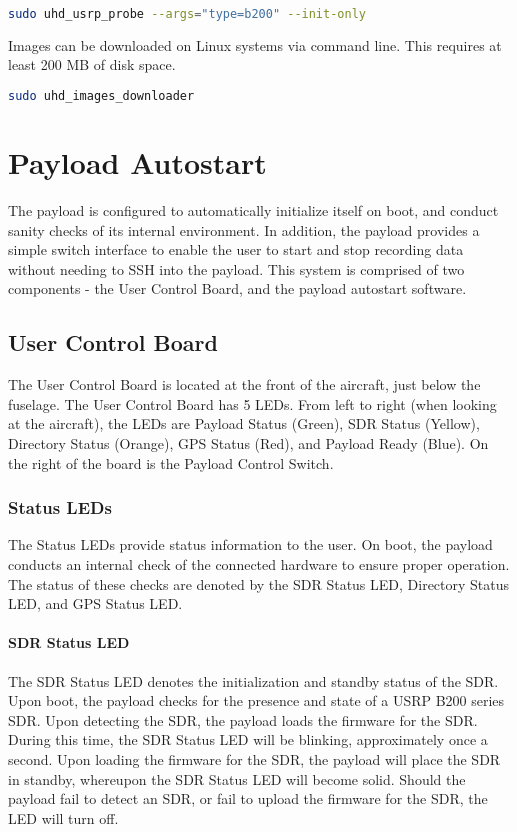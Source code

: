 \documentclass{report}
\begin{document}
				\begin{lstlisting}[language=sh]
sudo uhd_usrp_probe --args="type=b200" --init-only
				\end{lstlisting}

				Images can be downloaded on Linux systems via command line.  This requires at least 200 MB of disk space.

				\begin{lstlisting}[language=sh]
sudo uhd_images_downloader
				\end{lstlisting}
		\section{Payload Autostart}
			The payload is configured to automatically initialize itself on boot, and conduct sanity checks of its internal environment.  In addition, the payload provides a simple switch interface to enable the user to start and stop recording data without needing to SSH into the payload.  This system is comprised of two components - the User Control Board, and the payload autostart software.
			\subsection{User Control Board}
					The User Control Board is located at the front of the aircraft, just below the fuselage.  The User Control Board has 5 LEDs.  From left to right (when looking at the aircraft), the LEDs are Payload Status (Green), SDR Status (Yellow), Directory Status (Orange), GPS Status (Red), and Payload Ready (Blue).  On the right of the board is the Payload Control Switch.

						\subsubsection{Status LEDs}
							The Status LEDs provide status information to the user.  On boot, the payload conducts an internal check of the connected hardware to ensure proper operation.  The status of these checks are denoted by the SDR Status LED, Directory Status LED, and GPS Status LED.
								\paragraph{SDR Status LED}
									The SDR Status LED denotes the initialization and standby status of the SDR.  Upon boot, the payload checks for the presence and state of a USRP B200 series SDR.  Upon detecting the SDR, the payload loads the firmware for the SDR.  During this time, the SDR Status LED will be blinking, approximately once a second.  Upon loading the firmware for the SDR, the payload will place the SDR in standby, whereupon the SDR Status LED will become solid.  Should the payload fail to detect an SDR, or fail to upload the firmware for the SDR, the LED will turn off.
\end{document}
